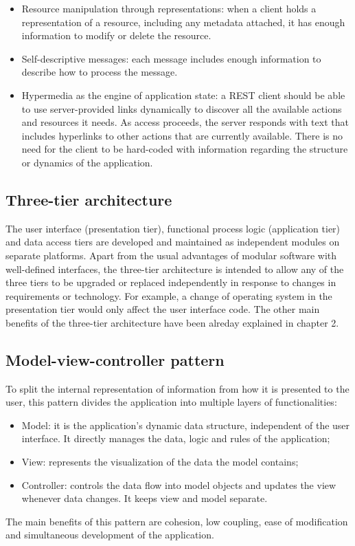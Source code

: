 \documentclass[12pt,a4paper]{report}
\begin{document}
\begin{itemize}
\begin{itemize}
		\item{Resource manipulation through representations}: when a client holds a representation of a resource, including any metadata attached, it has enough information to modify or delete the resource.
		\item{Self-descriptive messages}: each message includes enough information to describe how to process the message.
		\item{Hypermedia as the engine of application state}: a REST client should be able to use server-provided links dynamically to discover all the available actions and resources it needs. As access proceeds, the server responds with text that includes hyperlinks to other actions that are currently available. There is no need for the client to be hard-coded with information regarding the structure or dynamics of the application.
	\end{itemize}
	\end{itemize}
\subsection{Three-tier architecture}
The user interface (presentation tier), functional process logic (application tier) and data access tiers are developed and maintained as independent modules on separate platforms. Apart from the usual advantages of modular software with well-defined interfaces, the three-tier architecture is intended to allow any of the three tiers to be upgraded or replaced independently in response to changes in requirements or technology. For example, a change of operating system in the presentation tier would only affect the user interface code. The other main benefits of the three-tier architecture have been alreday explained in chapter 2.
\subsection{Model-view-controller pattern}
To split the internal representation of information from how it is presented to the user, this pattern divides the application into multiple layers of functionalities: 
\begin{itemize}
\item{Model}: it is the application's dynamic data structure, independent of the user interface. It directly manages the data, logic and rules of the application;
\item{View}: represents the visualization of the data the model contains;
\item{Controller}: controls the data flow into model objects and updates the view whenever data changes. It keeps view and model separate.
\end{itemize}
The main benefits of this pattern are cohesion, low coupling, ease of modification and simultaneous development of the application.
\end{document}
